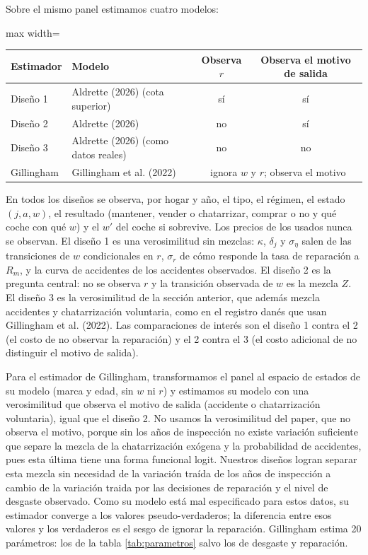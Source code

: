\documentclass{article}
\begin{document}
Sobre el mismo panel
estimamos cuatro modelos:
\begin{center}
\small
\begin{adjustbox}{max width=\textwidth}
\begin{tabular}{llcc}
\toprule
Estimador & Modelo & Observa $r$ & Observa el motivo de salida\\
\midrule
Diseño 1 & Aldrette (2026) (cota superior) & sí & sí\\
Diseño 2 & Aldrette (2026) & no & sí\\
Diseño 3 & Aldrette (2026) (como datos reales) & no & no\\
Gillingham & Gillingham et al. (2022) & \multicolumn{2}{c}{ignora $w$ y $r$; observa el motivo}\\
\bottomrule
\end{tabular}
\end{adjustbox}
\end{center}
En todos los diseños se observa, por hogar y año, el tipo, el régimen, el estado $(j,a,w)$, el resultado (mantener, vender o chatarrizar, comprar o no y qué coche con qué $w$) y el $w'$ del coche si sobrevive. Los precios de los usados nunca se observan. El diseño 1 es una verosimilitud sin mezclas: $\kappa$, $\delta_j$ y $\sigma_\eta$ salen de las transiciones de $w$ condicionales en $r$, $\sigma_r$ de cómo responde la tasa de reparación a $R_m$, y la curva de accidentes de los accidentes observados. El diseño 2 es la pregunta central: no se observa $r$ y la transición observada de $w$ es la mezcla $Z$. El diseño 3 es la verosimilitud de la sección anterior, que además mezcla accidentes y chatarrización voluntaria, como en el registro danés que usan Gillingham et al. (2022). Las comparaciones de interés son el diseño 1 contra el 2 (el costo de no observar la reparación) y el 2 contra el 3 (el costo adicional de no distinguir el motivo de salida).

Para el estimador de Gillingham, transformamos el panel al espacio de estados de su modelo (marca y edad, sin $w$ ni $r$) y estimamos su modelo con una verosimilitud que observa el motivo de salida (accidente o chatarrización voluntaria), igual que el diseño 2. No usamos la verosimilitud del paper, que no observa el motivo, porque sin los años de inspección no existe variación suficiente que separe la mezcla de la chatarrización exógena y la probabilidad de accidentes, pues esta última tiene una forma funcional logit. Nuestros diseños logran separar esta mezcla sin necesidad de la variación traída de los años de inspección a cambio de la variación traida por las decisiones de reparación y el nivel de desgaste observado. Como su modelo está mal especificado para estos datos, su estimador converge a los valores pseudo-verdaderos; la diferencia entre esos valores y los verdaderos es el sesgo de ignorar la reparación. Gillingham estima 20 parámetros: los de la tabla \ref{tab:parametros} salvo los de desgaste y reparación.
\end{document}

